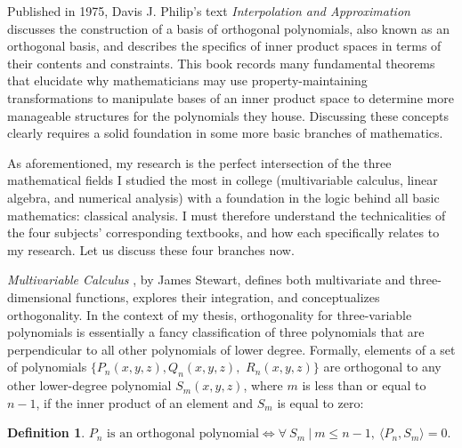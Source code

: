 \documentclass[letterpaper, 12pt]{article}
\newtheorem{defn}{Definition}[section]
\begin{document}
Published in 1975, Davis J. Philip's text \textit{Interpolation and Approximation} \cite{phl} discusses the construction of a basis of orthogonal polynomials, also known as an orthogonal basis, and describes the specifics of inner product spaces in terms of their contents and constraints. This book records many fundamental theorems that elucidate why mathematicians may use property-maintaining transformations to manipulate bases of an inner product space to determine more manageable structures for the polynomials they house. Discussing these concepts clearly requires a solid foundation in some more basic branches of mathematics.

As aforementioned, my research is the perfect intersection of the three mathematical fields I studied the most in college (multivariable calculus, linear algebra, and numerical analysis) with a foundation in the logic behind all basic mathematics: classical analysis. I must therefore understand the technicalities of the four subjects' corresponding textbooks, and how each specifically relates to my research. Let us discuss these four branches now.

\textit{Multivariable Calculus} \cite{stw}, by James Stewart, defines both multivariate and three-dimensional functions, explores their integration, and conceptualizes orthogonality. In the context of my thesis, orthogonality for three-variable polynomials is essentially a fancy classification of three polynomials that are perpendicular to all other polynomials of lower degree. Formally, elements of a set of polynomials $\{P_n(x, y, z), Q_n(x, y, z),$ $R_n(x, y, z)\}$ are orthogonal to any other lower-degree polynomial $S_m(x, y, z)$, where $m$ is less than or equal to $n-1$, if the inner product of an element and $S_m$ is equal to zero:

\vspace{4mm}
\begin{defn}
	$P_n \text{ is an orthogonal polynomial} \Longleftrightarrow \forall \ S_m \ | \ m \leq n-1, \ \langle P_n, S_m\rangle = 0.$
\end{defn}
\end{document}
